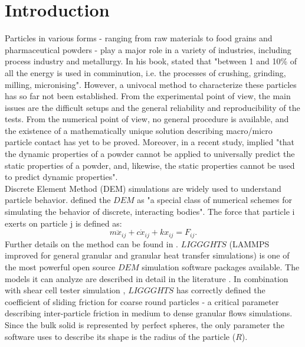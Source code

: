 \documentclass{CFD2015}
\begin{document}
\section{Introduction}
Particles in various forms - ranging from raw materials to food grains and pharmaceutical powders - play a major role in a variety of industries, including process industry and metallurgy. In his book, \citet{RefWorks:117} stated that "between 1 and 10\% of all the energy is used in comminution, i.e. the processes of crushing, grinding, milling, micronising". 
However, a univocal method to characterize these particles has so far not been established.
From the experimental point of view, the main issues are the difficult setups and the general reliability and reproducibility of the tests. 
From the numerical point of view, no general procedure is available, and the existence of a mathematically unique solution describing macro/micro particle contact has yet to be proved.
Moreover, in a recent study, \citet{RefWorks:56} implied "that the dynamic properties of a powder cannot be applied to universally predict the static properties of a powder, and, likewise, the static properties cannot be used to predict dynamic properties".\\
Discrete Element Method (DEM) simulations are widely used to understand particle behavior.
\citet{RefWorks:135} defined the $DEM$ as "a special class of numerical schemes for simulating the behavior of discrete, interacting bodies".
The force that particle i exerts on particle j is defined as:
\begin{equation}
m \ddot{x}_{ij} + c \dot{x}_{ij} + k x_{ij} =  F_{ij} .
\label{equ:newtonlaw}
\end{equation}
Further details on the method can be found in \citet{RefWorks:133}.
$LIGGGHTS$ (LAMMPS improved for general granular and granular heat transfer simulations) is one of the most powerful open source $DEM$ simulation software packages available. 
The models it can analyze are described in detail in the literature \cite{RefWorks:136}.\label{par:overviewdemliggghts}
In combination with shear cell tester simulation \cite{RefWorks:139}, $LIGGGHTS$ has correctly defined the coefficient of sliding friction for coarse round particles - 
a critical parameter describing inter-particle friction in medium to dense granular flows simulations.\\
Since the bulk solid is represented by perfect spheres, the only parameter the software uses to describe its shape is the radius of the particle ($R$).
\end{document}
